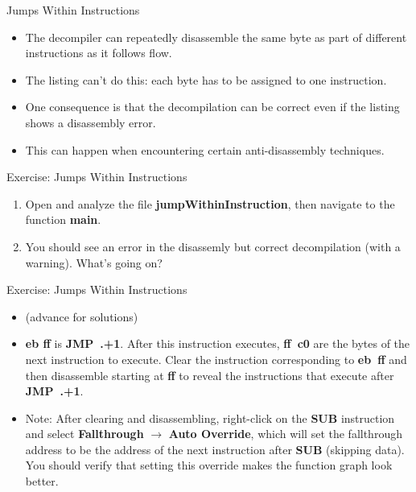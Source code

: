 \documentclass{beamer}
\begin{document}
\begin{frame}
\begin{block}{Jumps Within Instructions}
\begin{itemize}
\item The decompiler can repeatedly disassemble the same byte as part of different instructions as it follows flow.
\item The listing can't do this: each byte has to be assigned to one instruction.
\item One consequence is that the decompilation can be correct even if the listing shows a disassembly error.
\item This can happen when encountering certain anti-disassembly techniques.
\end{itemize}
\end{block}
\end{frame}

\begin{frame}
\begin{block}{Exercise: Jumps Within Instructions}
\begin{enumerate}
\item Open and analyze the file \textbf{jumpWithinInstruction}, then navigate to the function \textbf{main}.
\item You should see an error in the disassemly but correct decompilation (with a warning).  What's going on?
\end{enumerate}
\end{block}
\end{frame}

\begin{frame}
\begin{block}{Exercise: Jumps Within Instructions}
\begin{itemize}
\item[] (advance for solutions)
\pause
\item \textbf{eb ff} is \textbf{JMP~.+1}.  After this instruction executes, \textbf{ff~c0} are the bytes of the next instruction to execute.  Clear the 
instruction corresponding to \textbf{eb~ff} and then disassemble starting at \textbf{ff} to reveal the instructions that execute after \textbf{JMP~.+1}.
\item Note: After clearing and disassembling, right-click on the \textbf{SUB} instruction and select \textbf{Fallthrough} $\rightarrow$ \textbf{Auto Override}, which
will set the fallthrough address to be the address of the next instruction after \textbf{SUB} (skipping data).  You should verify that setting this override makes
the function graph look better.
\end{itemize}
\end{block}
\end{frame}
\end{document}
